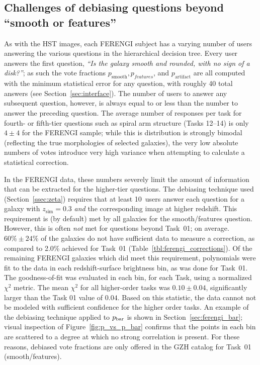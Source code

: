 \documentclass[twocolumn]{aastex6}
\begin{document}
\subsection{Challenges of debiasing questions beyond ``smooth or features''}
\label{ssec:higher_order_tasks}
As with the HST images, each FERENGI subject has a varying number of users answering the various questions in the hierarchical decision tree. Every user answers the first question, {\it ``Is the galaxy smooth and rounded, with no sign of a disk?''}; as such the vote fractions $p_\mathrm{smooth}, p_{features}$, and $p_\mathrm{artifact}$ are all computed with the minimum statistical error for any question, with roughly 40 total answers (see Section~\ref{sec:interface}). The number of users to answer any subsequent question, however, is always equal to or less than the number to answer the preceding question. The average number of responses per task for fourth- or fifth-tier questions such as spiral arm structure (Tasks 12--14) is only $4\pm4$ for the FERENGI sample; while this is distribution is strongly bimodal (reflecting the true morphologies of selected galaxies), the very low absolute numbers of votes introduce very high variance when attempting to calculate a statistical correction.

In the FERENGI data, these numbers severely limit the amount of information that can be extracted for the higher-tier questions. The debiasing technique used (Section~\ref{ssec:zeta}) requires that at least 10~users answer each question for a galaxy with $z_\mathrm{sim}=0.3$ \emph{and} the corresponding image at higher redshift. This requirement is (by default) met by all galaxies for the smooth/features question. However, this is often \emph{not} met for questions beyond Task~01; on average. $60\%\pm24\%$ of the galaxies do not have sufficient data to measure a correction, as compared to 2.0\% achieved for Task~01 (Table~\ref{tbl:ferengi_corrections}). Of the remaining FERENGI galaxies which did meet this requirement, polynomials were fit to the data in each redshift-surface brightness bin, as was done for Task~01. The goodness-of-fit was evaluated in each bin, for each Task, using a normalized $\chi^2$ metric. The mean $\chi^2$ for all higher-order tasks was $0.10\pm0.04$, significantly larger than the Task 01 value of $0.04$. Based on this statistic, the data cannot not be modeled with sufficient confidence for the higher order tasks. An example of the debiasing technique applied to $p_{\rm bar}$ is shown in Section~\ref{sec:ferengi_bar}; visual inspection of Figure~\ref{fig:p_vs_p_bar} confirms that the points in each bin are scattered to a degree at which no strong correlation is present. For these reasons, debiased vote fractions are only offered in the GZH catalog for Task~01 (smooth/features).  
\end{document}
